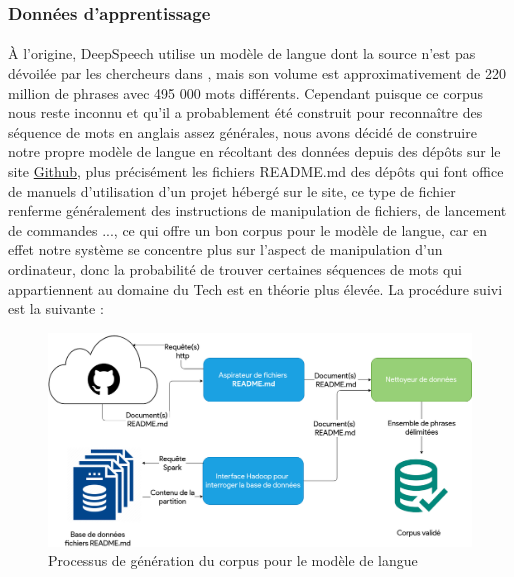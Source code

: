 		\subsubsection*{Données d'apprentissage}
		\paragraph{}
		À l'origine, DeepSpeech utilise un modèle de langue dont la source n'est pas dévoilée par les chercheurs dans \cite{deepspeech_paper}, mais son volume est approximativement de 220 million de phrases avec 495 000 mots différents. Cependant puisque ce corpus nous reste inconnu et qu'il a probablement été construit pour reconnaître des séquence de mots en anglais assez générales, nous avons décidé de construire notre propre modèle de langue en récoltant des données depuis des dépôts sur le site \href{https://github.com/}{Github}, plus précisément les fichiers README.md des dépôts qui font office de manuels d'utilisation d'un projet hébergé sur le site, ce type de fichier renferme généralement des instructions de manipulation de fichiers, de lancement de commandes ..., ce qui offre un bon corpus pour le modèle de langue, car en effet notre système se concentre plus sur l'aspect de manipulation d'un ordinateur, donc la probabilité de trouver certaines séquences de mots qui appartiennent au domaine du Tech est en théorie plus élevée. La procédure suivi est la suivante : 
		\begin{figure}[H] 
			\label{lm_gathering}
			\centering
			\includegraphics[width=0.88\linewidth]{images/Conception/ASR/lm_gathering.png}
			\caption{Processus de génération du corpus pour le modèle de langue}
		\end{figure}

